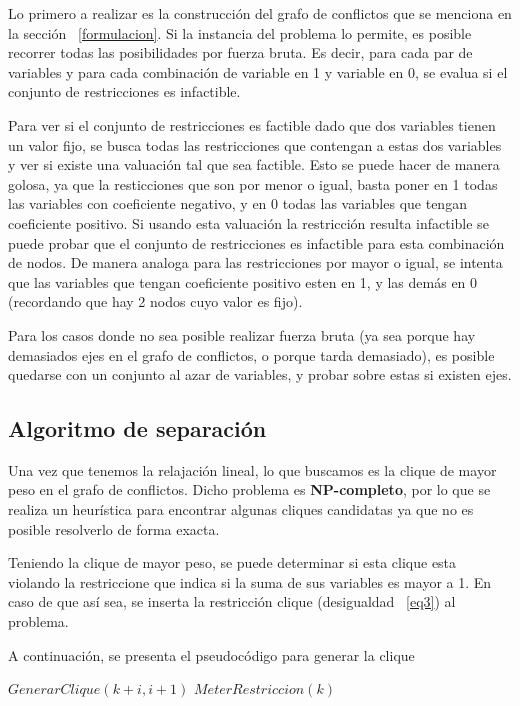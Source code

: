 Lo primero a realizar es la construcci\'on del grafo de conflictos que se menciona en la secci\'on ~\ref{formulacion}.
Si la instancia del problema lo permite, es posible recorrer todas las posibilidades por fuerza bruta. Es decir, para cada par de variables y para cada 
combinaci\'on de variable en 1 y variable en 0, se evalua si el conjunto de restricciones es infactible.

Para ver si el conjunto de restricciones es factible dado que dos variables tienen un valor fijo, se busca
todas las restricciones que contengan a estas dos variables y ver si existe una valuaci\'on tal que sea factible. Esto se puede hacer de manera
golosa, ya que la resticciones que son por menor o igual, basta poner en 1 todas las variables con coeficiente negativo, y en 0 todas las variables que tengan coeficiente positivo. Si usando
esta valuaci\'on la restricci\'on resulta infactible se puede probar que el conjunto de restricciones es infactible para esta combinaci\'on de nodos. De manera analoga para las restricciones
 por mayor o igual, se intenta que las variables que tengan coeficiente positivo esten en 1, y las dem\'as en 0 (recordando que hay 2 nodos cuyo valor es fijo).

Para los casos donde no sea posible realizar fuerza bruta (ya sea porque hay demasiados ejes en el grafo de conflictos, o porque tarda demasiado),
es posible quedarse  con un conjunto al azar de variables, y probar sobre estas si existen ejes.

\bigskip
\subsection{Algoritmo de separaci\'on}

Una vez que tenemos la relajaci\'on lineal, lo que buscamos es la clique de mayor peso en el grafo de conflictos. Dicho problema es {\bf NP-completo},
por lo que se realiza un heur\'istica para encontrar algunas cliques candidatas ya que no es posible resolverlo de forma exacta. 

Teniendo la clique de mayor peso, se puede determinar si esta clique esta violando la restriccione que indica si la suma de sus variables es mayor a 1. En caso 
de que as\'i sea, se inserta la restricci\'on clique (desigualdad ~\ref{eq3}) al problema.


A continuaci\'on, se presenta el pseudoc\'odigo para generar la clique
\newpage 

\begin{algorithmic}
\label{algo3}
 
     \State $GenerarClique(k+i,i+1)$ 
    \EndIf
  \EndFor
     $MeterRestriccion(k)$
     \EndIf
  \EndIf
\EndFunction
\end{algorithmic}
\bigskip

